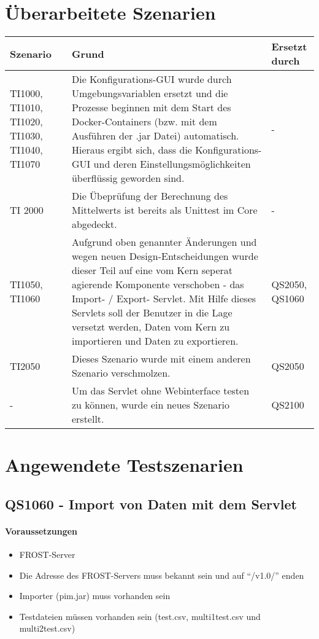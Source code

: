 \section{\"Uberarbeitete Szenarien}
\begin{table}[H]
\centering
\begin{tabular}{|L{1.3cm}|L{7cm}|L{2cm}|}
\hline
Szenario & Grund & Ersetzt durch\\
\hline
TI1000, TI1010, TI1020, TI1030, TI1040, TI1070 & Die Konfigurations-GUI wurde durch Umgebungsvariablen ersetzt und die Prozesse beginnen mit dem Start des Docker-Containers (bzw. mit dem Ausf\"uhren der .jar Datei) automatisch.
\newline
Hieraus ergibt sich, dass die Konfigurations-GUI und deren Einstellungsm\"oglichkeiten \"uberfl\"ussig geworden sind. & - \\ \hline
TI 2000 & Die Übeprüfung der Berechnung des Mittelwerts ist bereits als Unittest im Core abgedeckt. & - \\ \hline
TI1050, TI1060 & Aufgrund oben genannter \"Anderungen und wegen neuen Design-Entscheidungen wurde dieser Teil auf eine vom Kern seperat agierende Komponente verschoben - das Import- / Export- Servlet.
\newline
Mit Hilfe dieses Servlets soll der Benutzer in die Lage versetzt werden, Daten vom Kern zu importieren und Daten zu exportieren. & QS2050, QS1060 \\ \hline
TI2050 & Dieses Szenario wurde mit einem anderen Szenario verschmolzen. & QS2050 \\ \hline
- & Um das Servlet ohne Webinterface testen zu können, wurde ein neues Szenario erstellt. & QS2100 \\ \hline
\end{tabular}
\end{table}

\newpage
\section{Angewendete Testszenarien}
\subsection{QS1060 - Import von Daten mit dem Servlet}
\paragraph{Voraussetzungen}
\begin{itemize}
\item FROST-Server
\item Die Adresse des FROST-Servers muss bekannt sein und auf ``/v1.0/'' enden
\item Importer (pim.jar) muss vorhanden sein
\item Testdateien müssen vorhanden sein (test.csv, multi1test.csv und multi2test.csv)
\end{itemize}
